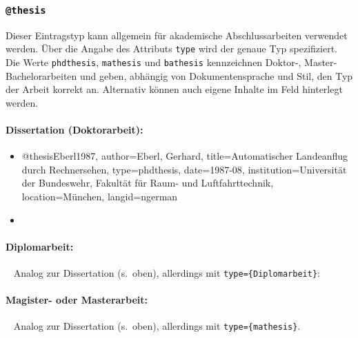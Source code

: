 
\subsubsection{\texttt{\bfseries @thesis}}
\label{sec:@thesis}

Dieser Eintragstyp kann allgemein für akademische Abschlussarbeiten verwendet werden. Über die Angabe des Attributs
\texttt{type} wird der genaue Typ spezifiziert. Die Werte \texttt{phdthesis}, \texttt{mathesis} und \texttt{bathesis}
kennzeichnen Doktor-, Master- \bzw Bachelorarbeiten und geben, abhängig von Dokumentensprache und Stil, den Typ der
Arbeit korrekt an. Alternativ können auch eigene Inhalte im Feld hinterlegt werden.

\paragraph{Dissertation (Doktorarbeit):}
%
\begin{itemize}
\item[]
\begin{GenericCode}[numbers=none]
@thesis{Eberl1987,
  author={Eberl, Gerhard},
  title={Automatischer Landeanflug durch Rechnersehen},
  type={phdthesis},
  date={1987-08},
  institution={Universität der Bundeswehr, Fakultät für Raum- und Luftfahrttechnik},
  location={München},
  langid={ngerman}
}
\end{GenericCode}
\item[\cite{Eberl1987}] 
\end{itemize}

\paragraph{Diplomarbeit:} ~ \newline
Analog zur Dissertation (s.\ oben), allerdings mit \texttt{type=\obnh\{Diplomarbeit\}}:%


\paragraph{Magister- oder Masterarbeit:} ~ \newline
Analog zur Dissertation (s.\ oben), allerdings mit \texttt{type=\{mathesis\}}.%

